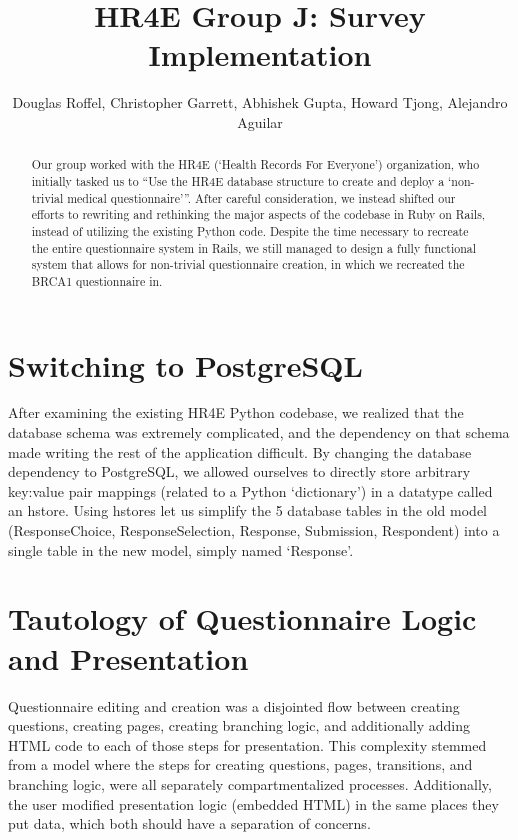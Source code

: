 \documentclass[10pt]{article}
\begin{document}
\title{HR4E Group J: Survey Implementation}
\author{Douglas Roffel, Christopher Garrett, Abhishek Gupta, Howard Tjong, Alejandro Aguilar}
\maketitle


\begin{abstract}
Our group worked with the HR4E (`Health Records For Everyone’) organization, who initially tasked us to ``Use the HR4E database structure to create and deploy a `non-trivial medical questionnaire'''. After careful consideration, we instead shifted our efforts to rewriting and rethinking the major aspects of the codebase in Ruby on Rails, instead of utilizing the existing Python code. Despite the time necessary to recreate the entire questionnaire system in Rails, we still managed to design a fully functional system that allows for non-trivial questionnaire creation, in which we recreated the BRCA1 questionnaire in.
\end{abstract}


\section*{Switching to PostgreSQL}
After examining the existing HR4E Python codebase, we realized that the database schema was extremely complicated, and the dependency on that schema made writing the rest of the application difficult. By changing the database dependency to PostgreSQL, we allowed ourselves to directly store arbitrary key:value pair mappings (related to a Python `dictionary') in a datatype called an hstore. Using hstores let us simplify the 5 database tables in the old model (ResponseChoice, ResponseSelection, Response, Submission, Respondent) into a single table in the new model, simply named `Response'.


\section*{Tautology of Questionnaire Logic and Presentation}\label{prelim-sect}
Questionnaire editing and creation was a disjointed flow between creating questions, creating pages, creating branching logic, and additionally adding HTML code to each of those steps for presentation. This complexity stemmed from a model where the steps for creating questions, pages, transitions, and branching logic, were all separately compartmentalized processes. Additionally, the user modified presentation logic (embedded HTML) in the same places they put data, which both should have a separation of concerns.
\end{document}
